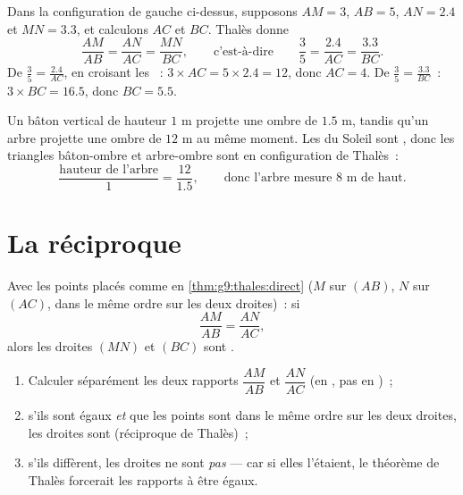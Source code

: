 \begin{example}\label{ex:g9:thales:compute}
Dans la configuration de gauche ci-dessus, supposons $AM = 3$, $AB = 5$,
$AN = 2.4$ et $MN = 3.3$, et calculons $AC$ et $BC$. Thalès donne
\[
\frac{AM}{AB} = \frac{AN}{AC} = \frac{MN}{BC},
\qquad\text{c'est-à-dire}\qquad
\frac35 = \frac{2.4}{AC} = \frac{3.3}{BC}.
\]
De $\frac35 = \frac{2.4}{AC}$, en croisant les ~:
$3 \times AC = 5 \times 2.4 = 12$, donc $AC = 4$. De
$\frac35 = \frac{3.3}{BC}$~: $3 \times BC = 16.5$, donc $BC = 5.5$.
\end{example}

\begin{example}\label{ex:g9:thales:stick}
Un bâton vertical de hauteur $1$ m projette une ombre de $1.5$ m,
tandis qu'un arbre projette une ombre de $12$ m au même moment. Les
 du Soleil sont , donc les triangles bâton-ombre et
arbre-ombre sont en configuration de Thalès~:
\[
\frac{\text{hauteur de l'arbre}}{1} = \frac{12}{1.5},
\qquad\text{donc l'arbre mesure } 8 \text{ m de haut.}
\]
\end{example}

\section{La réciproque}

\begin{theorem}\label{thm:g9:thales:converse}
Avec les points placés comme en \cref{thm:g9:thales:direct} ($M$ sur
$(AB)$, $N$ sur $(AC)$, dans le même ordre sur les deux droites)~: si
\[
\frac{AM}{AB} = \frac{AN}{AC},
\]
alors les droites $(MN)$ et $(BC)$ sont .
\end{theorem}
\admitted

\begin{method}\label{met:g9:thales:converse}
\begin{enumerate}
  \item Calculer séparément les deux rapports $\dfrac{AM}{AB}$ et
        $\dfrac{AN}{AC}$ (en , pas en )~;
  \item s'ils sont égaux \emph{et} que les points sont dans le même
        ordre sur les deux droites, les droites sont 
        (réciproque de Thalès)~;
  \item s'ils diffèrent, les droites ne sont \emph{pas}  ---
        car si elles l'étaient, le théorème de Thalès forcerait les
        rapports à être égaux.
\end{enumerate}
\end{method}

